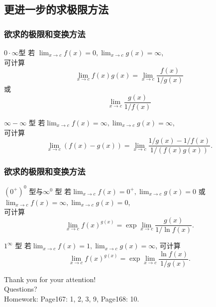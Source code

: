 \documentclass[
10pt,
aspectratio=43,
]{beamer}
\begin{document}
\subsection{更进一步的求极限方法}
\begin{frame} \frametitle{欲求的极限和变换方法}

	\everymath{\displaystyle}

	\begin{block}{$0\cdot\infty$型} 
		若 $\lim _{x \rightarrow c} f(x)=0, \lim _{x \rightarrow c} g(x)=\infty$, \\
		可计算
		$$\lim _{x \rightarrow c} f(x) g(x)=\lim _{x \rightarrow c} \frac{f(x)}{1 / g(x)}$$ 或 $$\lim _{x \rightarrow c} \frac{g(x)}{1 / f(x)}$$
	\end{block}
\pause
	\begin{block}{$\infty-\infty$ 型}
		若$\lim _{x \rightarrow c} f(x)=\infty, \lim _{x \rightarrow c} g(x)=\infty$, \\
		可计算$$\lim _{x \rightarrow c}(f(x)-g(x))=\lim _{x \rightarrow c} \frac{1 / g(x)-1 / f(x)}{1 /(f(x) g(x))}.$$
	\end{block}

\end{frame}

\begin{frame} \frametitle{欲求的极限和变换方法}

	\everymath{\displaystyle}

	\begin{block}{$(0^+)^0$ 型与$\infty^0$ 型} 
		若$\lim _{x \rightarrow c} f(x)=0^{+}, \lim _{x \rightarrow c} g(x)=0$ 或 $\lim _{x \rightarrow c} f(x)=\infty, \lim _{x \rightarrow c} g(x)=0$, \\
		可计算$$\lim _{x \rightarrow c} f(x)^{g(x)}=\exp \lim _{x \rightarrow c} \frac{g(x)}{1 / \ln f(x)}.$$
	\end{block}
\pause
	\begin{block}{$1^\infty$ 型} 
		若$\lim _{x \rightarrow c} f(x)=1, \lim _{x \rightarrow c} g(x)=\infty$, 可计算 \\
		$$\lim _{x \rightarrow c} f(x)^{g(x)}=\exp \lim _{x \rightarrow c} \frac{\ln f(x)}{1 / g(x)}.$$
	\end{block}

\end{frame}


\begin{frame}[plain]
	\vfill
	\centering
	{
	\centering \Huge \color{white} Thank you for your attention!\\[10pt]Questions?\\ [10pt] Homework: Page167: 1, 2, 3, 9, Page168: 10.
	}
	\vfill
\end{frame}
\end{document}
